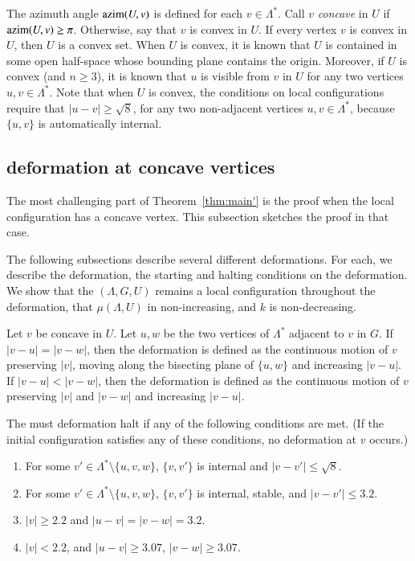 The azimuth angle
${\operatorname{azim}}(U,v)$ is defined for each $v\in\Lambda^*$.  
Call $v$ {\it concave} in $U$
if ${\operatorname{azim}}(U,v)\ge\pi$.  Otherwise, say that $v$ is convex
in $U$.  If every vertex $v$ is convex in $U$, then $U$
is a convex set.  When $U$ is convex, it is known that $U$
is contained in some open half-space whose bounding plane
contains the origin.  Moreover,
if $U$ is convex (and $n\ge 3$),
it is known that $u$ is visible from $v$ in $U$
for any two vertices $u,v\in\Lambda^*$.  Note that when $U$ is 
convex, the conditions on local configurations require that
$|u-v|\ge\sqrt8$, for any two non-adjacent vertices $u,v\in\Lambda^*$,
because $\{u,v\}$ is automatically internal.

\subsection{deformation at concave vertices}

The most challenging part  of Theorem~\ref{thm:main'} is the
proof when the local configuration has a concave vertex.  This subsection
sketches the proof in that case.

The following subsections describe several different  deformations.  For each,
we describe the deformation, the starting and halting conditions on 
the deformation.  We show that the $(\Lambda,G,U)$ remains a local
configuration throughout the deformation, 
 that  $\mu(\Lambda,U)$ in non-increasing, and $k$ is
non-decreasing.


Let $v$ be concave in $U$.  Let $u,w$ be the two vertices of
$\Lambda^*$ adjacent to $v$ in $G$. 
If $|v-u|=|v-w|$, then the deformation is defined as the continuous motion
of $v$ preserving $|v|$,  moving along the bisecting plane of $\{u,w\}$
and increasing $|v-u|$.  If $|v-u|<|v-w|$, then the deformation
is defined as the continuous motion of $v$ preserving $|v|$ and
$|v-w|$ and increasing $|v-u|$.

The must deformation halt if any of the following conditions
are met.  (If the initial configuration satisfies any of these conditions,
no deformation at $v$ occurs.)
\begin{enumerate}\label{e:halt}
\item For some $v'\in\Lambda^*\setminus\{u,v,w\}$, 
$\{v,v'\}$ is internal and $|v-v'|\le \sqrt8$.
\item For some $v'\in\Lambda^*\setminus\{u,v,w\}$,
$\{v,v'\}$ is internal, stable, and $|v-v'|\le 3.2$.
\item $|v|\ge 2.2$ and $|u-v|=|v-w|=3.2$.  
\item $|v|< 2.2$, 
and $|u-v|\ge 3.07$, $|v-w|\ge 3.07$.
\end{enumerate}

